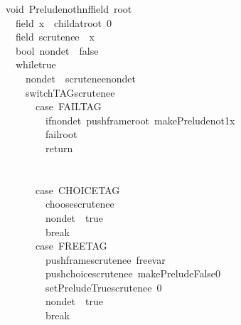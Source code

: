 \documentclass{book}
\theoremstyle{definition}
\begin{document}
\begin{figure}
\begin{tabbing}\ttfamily
~void~Preludenothnffield~root~\\
\ttfamily ~~~field~x~~childatroot~0\\
\ttfamily ~~~field~scrutenee~~x\\
\ttfamily ~~~bool~nondet~~false\\
\ttfamily ~~~whiletrue~\\
\ttfamily ~~~~~nondet~~scruteneenondet\\
\ttfamily ~~~~~switchTAGscrutenee~\\
\ttfamily ~~~~~~~case~FAILTAG\\
\ttfamily ~~~~~~~~~ifnondet~pushframeroot~makePreludenot1x\\
\ttfamily ~~~~~~~~~failroot\\
\ttfamily ~~~~~~~~~return\\
\ttfamily ~\\
\ttfamily ~~~~~~~\\
\ttfamily ~~~~~~~case~CHOICETAG\\
\ttfamily ~~~~~~~~~choosescrutenee\\
\ttfamily ~~~~~~~~~nondet~~true\\
\ttfamily ~~~~~~~~~break\\
\ttfamily ~~~~~~~case~FREETAG\\
\ttfamily ~~~~~~~~~pushframescrutenee~freevar\\
\ttfamily ~~~~~~~~~pushchoicescrutenee~makePreludeFalse0\\
\ttfamily ~~~~~~~~~setPreludeTruescrutenee~0\\
\ttfamily ~~~~~~~~~nondet~~true\\
\ttfamily ~~~~~~~~~break\\

\end{tabbing}
\end{figure}
\end{document}
